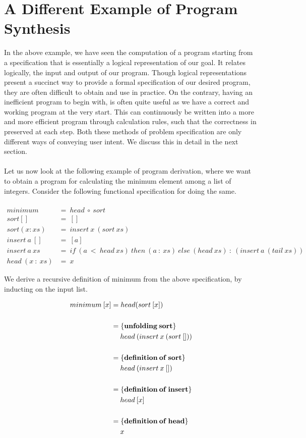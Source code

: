 \section {A Different Example of Program Synthesis}
In the above example, we have seen the computation of a program starting from a specification that is essentially a logical representation of our goal. It relates logically, the input and output of our program. Though logical representations present a succinct way to provide a formal specification of our desired program, they are often difficult to obtain and use in practice. On the contrary, having an inefficient program to begin with, is often quite useful as we have a correct and working program at the very start. This can continuously be written into a more and more efficient program through calculation rules, such that the correctness in preserved at each step. Both these methods of problem specification are only different ways of conveying user intent. We discuss this in detail in the next section. \\\\
Let us now look at the following example of program derivation, where we want to obtain a program for calculating the minimum element among a list of integers. Consider the following functional specification for doing the same. \\\\

\begin{align*}
minimum &=\: head\: \circ\: sort \\
sort [] &=\: [] \\
sort (x : xs) &=\: insert\: x\: (sort\: xs) \\
insert\: a\: [] &=\: [a] \\
insert\: a\: xs &=\: if\: (a\: <\: head\: xs)\: then\: (a\: :\: xs)\: else\: (head\: xs)\: :\: (insert\: a\: (tail\: xs)) \\
head\: (x\: :\: xs) &=\: x
\end{align*}

\noindent
We derive a recursive definition of minimum from the above specification, by inducting on the input list.

\vspace{0.5em}
\begin{equation*}
\begin{split}
minimum\: [x] &= head(sort\: [x]) \\\\
&= \{\bf{unfolding}\: sort\} \\ &\quad \; head\: (insert\: x\: (sort\: [])) \\\\
&= \{\bf{definition\: of}\: sort\} \\ &\quad \; head\: (insert\: x\: []) \\\\
&= \{\bf{definition\: of}\: insert\} \\ &\quad \; head\: [x] \\\\
&= \{\bf{definition\: of}\: head\} \\ &\quad \; x
\end{split}
\end{equation*}

